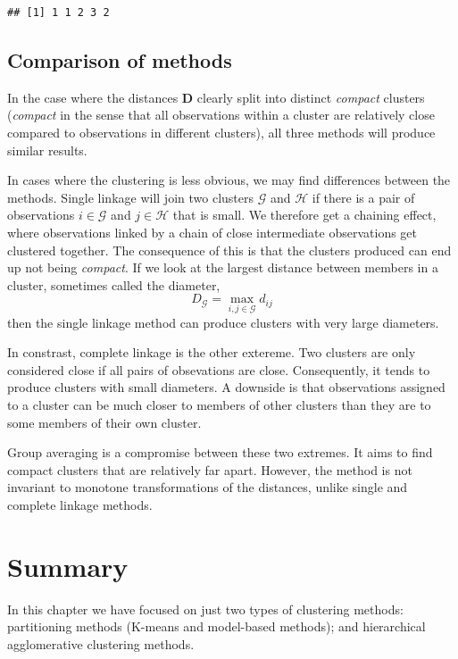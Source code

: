 \documentclass[
]{book}
\theoremstyle{definition}
\theoremstyle{definition}
\theoremstyle{definition}
\theoremstyle{definition}
\theoremstyle{remark}
\begin{document}
\begin{verbatim}
## [1] 1 1 2 3 2
\end{verbatim}

\subsection{Comparison of methods}\label{comparison-of-methods}

In the case where the distances \(\mathbf D\) clearly split into distinct \emph{compact} clusters (\emph{compact} in the sense that all observations within a cluster are relatively close compared to observations in different clusters), all three methods will produce similar results.

In cases where the clustering is less obvious, we may find differences between the methods. Single linkage will join two clusters \(\mathcal{G}\) and \(\mathcal{H}\) if there is a pair of observations \(i\in \mathcal{G}\) and \(j \in \mathcal{H}\) that is small. We therefore get a chaining effect, where observations linked by a chain of close intermediate observations get clustered together. The consequence of this is that the clusters produced can end up not being \emph{compact}. If we look at the largest distance between members in a cluster, sometimes called the diameter,
\[D_\mathcal{G}= \max_{i,j \in \mathcal{G}} d_{ij}\]
then the single linkage method can produce clusters with very large diameters.

In constrast, complete linkage is the other extereme. Two clusters are only considered close if all pairs of obsevations are close. Consequently, it tends to produce clusters with small diameters. A downside is that observations assigned to a cluster can be much closer to members of other clusters than they are to some members of their own cluster.

Group averaging is a compromise between these two extremes. It aims to find compact clusters that are relatively far apart. However, the method is not invariant to monotone transformations of the distances, unlike single and complete linkage methods.

\section{Summary}\label{summary}

In this chapter we have focused on just two types of clustering methods: partitioning methods (K-means and model-based methods); and hierarchical agglomerative clustering methods.
\end{document}
